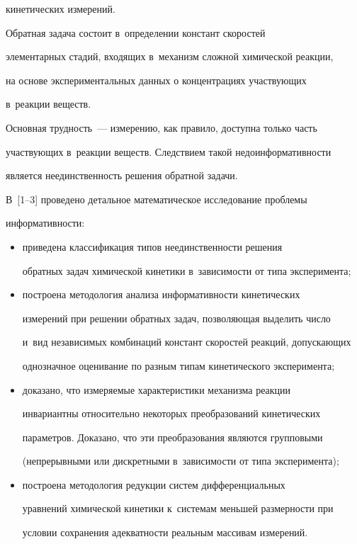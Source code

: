 кинетических измерений.

  

  Обратная задача состоит в~определении констант скоростей 

элементарных стадий, входящих в~механизм сложной химической реакции, 

на основе экспериментальных данных о концентрациях участвующих 

в~реакции веществ.

  

  Основная трудность~--- измерению, как правило, доступна только часть 

участвующих в~реакции веществ. Следствием такой недоинформативности 

является неединственность решения обратной задачи. 

  

  В~[1--3] проведено детальное математическое исследование проблемы  

информативности:

  \begin{itemize}

  \item  приведена классификация типов неединственности решения 

обратных задач химической кинетики в~зависимости от типа эксперимента; 

  \item построена методология анализа информативности кинетических 

измерений при решении обратных задач, позволяющая выделить число 

и~вид независимых комбинаций констант скоростей реакций, допускающих 

однозначное оценивание по разным типам кинетического эксперимента;

  \item доказано, что измеряемые характеристики механизма реакции 

инвариантны относительно некоторых преобразований кинетических 

параметров. Доказано, что эти преобразования являются групповыми 

(непрерывными или дискретными в~зависимости от типа эксперимента); 

  \item построена методология редукции систем дифференциальных 

уравнений химической кинетики к~системам меньшей размерности при 

условии сохранения адекватности реальным массивам измерений. 

  \end{itemize}

